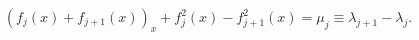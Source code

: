 \begin{equation}\label{chain}
(f_j(x)+f_{j+1}(x))_x+f_j^2(x)-f_{j+1}^2(x)=
\mu_j\equiv \lambda_{j+1}-\lambda_j.
\end{equation}

